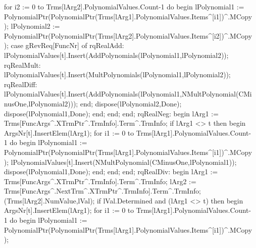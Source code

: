                               for i2 := 0 to Trms[lArg2].PolynomialValues.Count-1 do
                              begin
                                 lPolynomial1 := PolynomialPtr(PolynomialPtr(Trms[lArg1].PolynomialValues.Items^[i1])^.MCopy);
                                 lPolynomial2 := PolynomialPtr(PolynomialPtr(Trms[lArg2].PolynomialValues.Items^[i2])^.MCopy);
                                 case gRevReq[FuncNr] of
                                    rqRealAdd:
                                       lPolynomialValues[t].Insert(AddPolynomials(lPolynomial1,lPolynomial2));
                                    rqRealMult:
                                       lPolynomialValues[t].Insert(MultPolynomials(lPolynomial1,lPolynomial2));
                                    rqRealDiff:
                                       lPolynomialValues[t].Insert(AddPolynomials(lPolynomial1,NMultPolynomial(CMinusOne,lPolynomial2)));
                                 end;
                                 dispose(lPolynomial2,Done);
                                 dispose(lPolynomial1,Done);
                              end;
                        end;
                     end;
                  rqRealNeg:
                     begin
                        lArg1 := Trms[FuncArgs^.XTrmPtr^.TrmInfo].Term^.TrmInfo;
                        if lArg1 <> t then
                        begin
                           ArgsNr[t].InsertElem(lArg1);
                           for i1 := 0 to Trms[lArg1].PolynomialValues.Count-1 do
                           begin
                              lPolynomial1 := PolynomialPtr(PolynomialPtr(Trms[lArg1].PolynomialValues.Items^[i1])^.MCopy);
                              lPolynomialValues[t].Insert(NMultPolynomial(CMinusOne,lPolynomial1));
                              dispose(lPolynomial1,Done);
                           end;
                        end;
                     end;
                  rqRealDiv:
                     begin
                        lArg1 := Trms[FuncArgs^.XTrmPtr^.TrmInfo].Term^.TrmInfo;
                        lArg2 := Trms[FuncArgs^.NextTrm^.XTrmPtr^.TrmInfo].Term^.TrmInfo;
                        (Trms[lArg2].NumValue,lVal);
                        if lVal.Determined and (lArg1 <> t) then
                        begin
                           ArgsNr[t].InsertElem(lArg1);
                           for i1 := 0 to Trms[lArg1].PolynomialValues.Count-1 do
                           begin
                              lPolynomial1 := PolynomialPtr(PolynomialPtr(Trms[lArg1].PolynomialValues.Items^[i1])^.MCopy);
